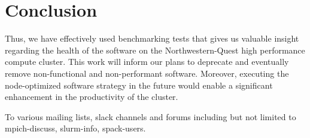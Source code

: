 \documentclass[sigconf,authordraft]{acmart}
\begin{document}
\section{Conclusion}

Thus, we have effectively used benchmarking tests that gives us valuable insight regarding the health of the software on the Northwestern-Quest high performance compute cluster. This work will inform our plans to deprecate and eventually remove non-functional and non-performant software. Moreover, executing the node-optimized software strategy in the future would enable a significant enhancement in the productivity of the cluster.

\begin{acks}
To various mailing lists, slack channels and forums including but not limited to mpich-discuss, slurm-info, spack-users.
\end{acks}




\end{document}
